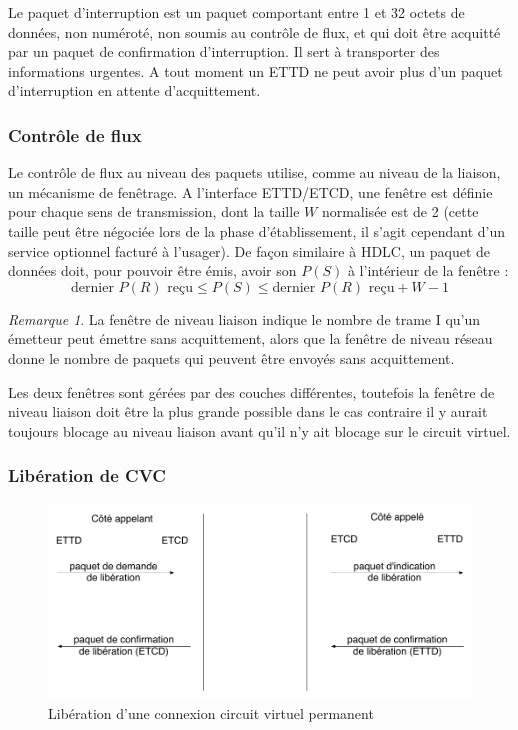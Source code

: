 \documentclass[11pt,english,french]{scrreprt}
\theoremstyle{remark}
\newtheorem*{rem*}{Remarque}
\theoremstyle{definition}
\begin{document}
Le paquet d'interruption est un paquet comportant entre 1 et 32 octets de données, non numéroté, non soumis au contrôle de flux, et qui doit être acquitté par un paquet de confirmation d'interruption. Il sert à transporter des informations urgentes. A tout moment un ETTD ne peut avoir plus d'un paquet d'interruption en attente d'acquittement.


\subsubsection*{Contrôle de flux} %

Le contrôle de flux au niveau des paquets utilise, comme au niveau de la liaison, un mécanisme de fenêtrage. A l'interface ETTD/ETCD, une fenêtre est définie pour chaque sens de transmission, dont la taille $W$ normalisée est de 2 (cette taille peut être négociée lors de la phase d'établissement, il s'agit cependant d'un service optionnel facturé à l'usager). De façon similaire à HDLC, un paquet de données doit, pour pouvoir être émis, avoir son $P(S)$ à l'intérieur de la fenêtre :
\[
	\textrm{dernier } P(R) \textrm{ reçu} \leqslant P(S) \leqslant \textrm{dernier } P(R) \textrm{ reçu} + W - 1
\]

\begin{rem*}
La fenêtre de niveau liaison indique le nombre de trame I qu'un émetteur peut émettre sans acquittement, alors que la fenêtre de niveau réseau donne le nombre de paquets qui peuvent être envoyés sans acquittement.

Les deux fenêtres sont gérées par des couches différentes, toutefois la fenêtre de niveau liaison doit être la plus grande possible dans le cas contraire il y aurait toujours blocage au niveau liaison avant qu'il n'y ait blocage sur le circuit virtuel.
\end{rem*}

\subsubsection{Libération de CVC} %

\begin{figure}[h!]
	\center
	\includegraphics[scale=.7]{graphes/X25-liberation}
	\caption{Libération d'une connexion circuit virtuel permanent}
\end{figure}
\end{document}

